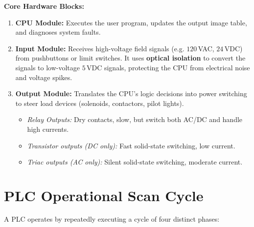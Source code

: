 \documentclass[12pt,a4paper]{article}
\begin{document}
\textbf{Core Hardware Blocks:}
\begin{enumerate}[label=\textbf{\arabic*.}, leftmargin=*]
  \item \textbf{CPU Module:} Executes the user program, updates the output image table, and diagnoses system faults.
  \item \textbf{Input Module:} Receives high-voltage field signals (e.g. $120\,$VAC, $24\,$VDC) from pushbuttons or limit switches. It uses \textbf{optical isolation} to convert the signals to low-voltage $5\,$VDC signals, protecting the CPU from electrical noise and voltage spikes.
  \item \textbf{Output Module:} Translates the CPU's logic decisions into power switching to steer load devices (solenoids, contactors, pilot lights).
    \begin{itemize}[leftmargin=*, itemsep=2pt]
      \item \textit{Relay Outputs:} Dry contacts, slow, but switch both AC/DC and handle high currents.
      \item \textit{Transistor outputs (DC only):} Fast solid-state switching, low current.
      \item \textit{Triac outputs (AC only):} Silent solid-state switching, moderate current.
    \end{itemize}
\end{enumerate}

\section{PLC Operational Scan Cycle}

A PLC operates by repeatedly executing a cycle of four distinct phases:

\begin{tcolorbox}[tikzbox, title={PLC Cycle Scan Flow}]
\centering
{}
\end{tcolorbox}
\end{document}
